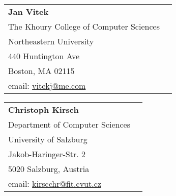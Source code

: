 
\newcommand\referee[6]{\textbf{#1}\\{\small #2}\\{\small #3}\\{\small #4}\\{\small #5}\\{\small email: \url{#6}}}


    \begin{tabular}{@{}p{6cm}p{6cm}}
      \referee
          {Jan Vitek}
          {The Khoury College of Computer Sciences}
          {Northeastern University}
          {440 Huntington Ave}
          {Boston, MA 02115}
          {vitekj@me.com}
    \end{tabular}
    \begin{tabular}{@{}p{6cm}p{6cm}}
      \referee
          {Christoph Kirsch}
          {Department of Computer Sciences}
          {University of Salzburg}
          {Jakob-Haringer-Str. 2}
          {5020 Salzburg, Austria}
          {kirscchr@fit.cvut.cz}
    \end{tabular}


